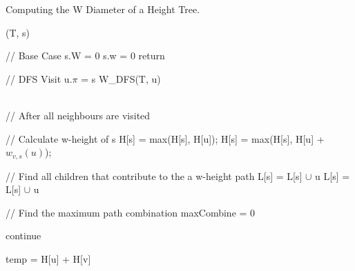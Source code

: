 

\begin{algorithm}[h]{}
\caption{Computing the W Diameter of a Height Tree.}
\begin{algorithmic}[1]
    \label{algo:dp}%

    (T, s)

    \State // Base Case
        \State s.W = 0
        \State s.w = 0
        \State return
    \EndIf


    \State // DFS Visit
            \State u.$\pi$ = s
            \State W\_DFS(T, u)
        \EndIf
    \EndFor

    \\

    \State // After all neighbours are visited

    \State // Calculate w-height of s
            \State H[s] = max(H[s], H[u]);
        \Else
                \State H[s] = max(H[s], H[u] + $w_{v, s}(u)$);
            \EndFor
        \EndIf
    \EndFor

    \State // Find all children that contribute to the a w-height path
            \State L[s] = L[s] $\cup$ u
        \Else
                    \State L[s] = L[s] $\cup$ u
                \EndIf
            \EndFor
        \EndIf

    \EndFor

    \State // Find the maximum path combination
    \State maxCombine = 0


                \State continue
            \EndIf

            \State temp = H[u] + H[v]


\end{algorithmic}
\end{algorithm}

